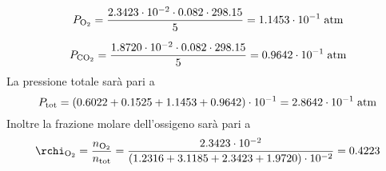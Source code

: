 \begin{soluzione}
\begin{gather*}
        P_{\rm O_2}
        =\frac{2.3423 \cdot 10^{-2} \cdot 0.082 \cdot 298.15}{5}
        =1.1453 \cdot 10^{-1} \; \rm atm
        \\[0.2cm]
        P_{\rm CO_2}
        =\frac{1.8720 \cdot 10^{-2} \cdot 0.082 \cdot 298.15}{5}
        =0.9642 \cdot 10^{-1} \; \rm atm
    \end{gather*}
    La pressione totale sarà pari a
    \begin{equation*}
        P_{\rm tot}
        =(0.6022 + 0.1525 + 1.1453 + 0.9642) \cdot 10^{-1}
        =2.8642 \cdot 10^{-1} \; \rm atm
    \end{equation*}
    Inoltre la frazione molare dell'ossigeno sarà pari a
    \begin{equation*}
        \rchi_{\rm O_2}
        =\frac{n_{\rm O_2}}{n_{\rm tot}}
        =\frac{2.3423 \cdot 10^{-2}}{(1.2316 + 3.1185 + 2.3423 + 1.9720) \cdot 10^{-2}}
        =0.4223
    \end{equation*}
\end{soluzione}

\newpage

